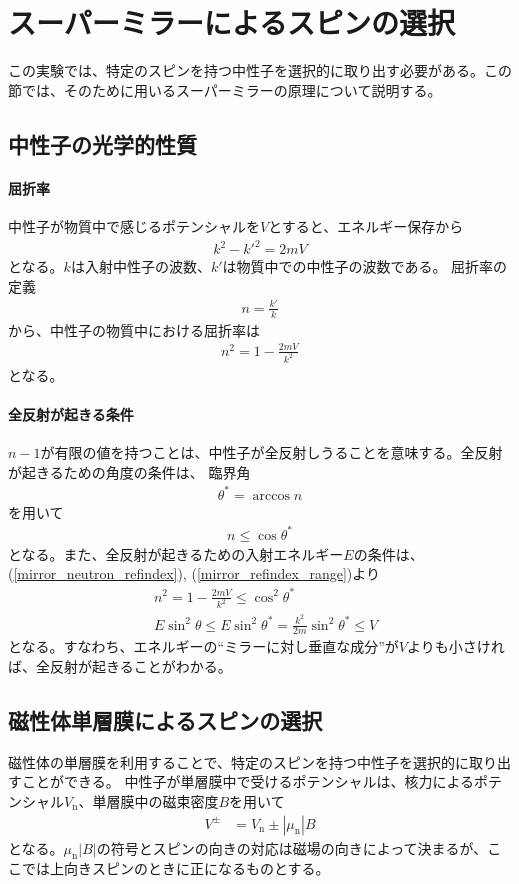 \section{スーパーミラーによるスピンの選択}
\nocite{neutron_spin_optics}
この実験では、特定のスピンを持つ中性子を選択的に取り出す必要がある。この節では、そのために用いるスーパーミラーの原理について説明する。

\subsection{中性子の光学的性質}
\paragraph{屈折率}
中性子が物質中で感じるポテンシャルを$V$とすると、エネルギー保存から
\begin{align}
k^2-k'^2=2mV
\end{align}
となる。$k$は入射中性子の波数、$k'$は物質中での中性子の波数である。
屈折率の定義
\begin{align}
n=\frac{k'}{k}
\end{align}
から、中性子の物質中における屈折率は
\begin{align}
n^2=1-\frac{2mV}{k^2}\label{mirror_neutron_refindex}
\end{align}
となる。

\paragraph{全反射が起きる条件}\label{mirrir_perfect_reflection}
$n-1$が有限の値を持つことは、中性子が全反射しうることを意味する。全反射が起きるための角度の条件は、
臨界角
\begin{align}
\theta^*=\arccos{n}
\end{align}
を用いて
\begin{align}
n\leq\cos\theta^* \label{mirror_refindex_range}
\end{align}
となる。また、全反射が起きるための入射エネルギー$E$の条件は、(\ref{mirror_neutron_refindex}), (\ref{mirror_refindex_range})より
\begin{align}
&n^2=1-\frac{2mV}{k^2}\leq\cos^2\theta^*\\
&E\sin^2\theta\leq E\sin^2\theta^*=\frac{k^2}{2m}\sin^2\theta^*\leq V
\end{align}
となる。すなわち、エネルギーの``ミラーに対し垂直な成分''が$V$よりも小さければ、全反射が起きることがわかる。

\subsection{磁性体単層膜によるスピンの選択}
磁性体の単層膜を利用することで、特定のスピンを持つ中性子を選択的に取り出すことができる。
中性子が単層膜中で受けるポテンシャルは、核力によるポテンシャル$V_\mathrm{n}$、単層膜中の磁束密度$B$を用いて
\begin{align}
V^{\pm}&=V_\mathrm{n}\pm|\mu_\mathrm{n}|B
\end{align}
となる。$\mu_\mathrm{n}|B|$の符号とスピンの向きの対応は磁場の向きによって決まるが、ここでは上向きスピンのときに正になるものとする。

